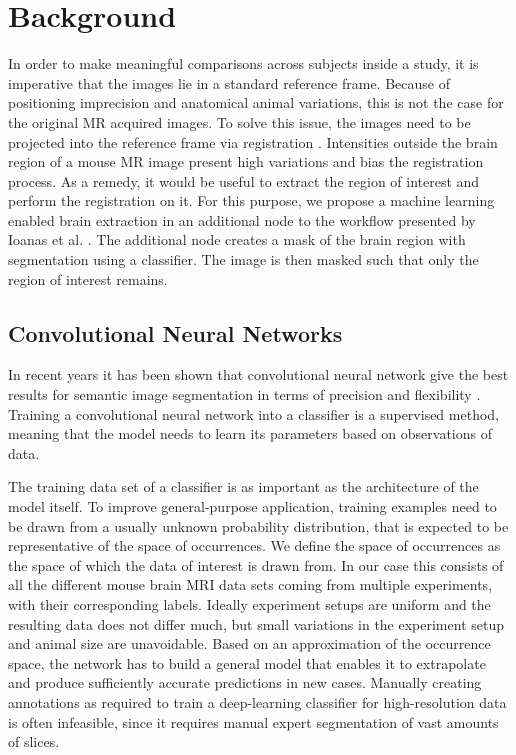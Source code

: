\section{Background}
In order to make meaningful comparisons across subjects inside a study, it is imperative that the images lie in a standard reference frame.
Because of positioning imprecision and anatomical animal variations, this is not the case for the original MR acquired images.
To solve this issue, the images need to be projected into the reference frame via registration \cite{maintz_overview_nodate, sotiras_deformable_2013}. 
Intensities outside the brain region of a mouse MR image present high variations and bias the registration process.
As a remedy, it would be useful to extract the region of interest and perform the registration on it.
For this purpose, we propose a machine learning enabled brain extraction in an additional node to the workflow presented by Ioanas et al. \cite{ioanas_optimized_2019}.
The additional node creates a mask of the brain region with segmentation using a classifier.
The image is then masked such that only the region of interest remains.


\subsection{Convolutional Neural Networks} \label{sec:Convolutional Neural Networks}
In recent years it has been shown that convolutional neural network give the best results for semantic image segmentation in terms of precision and flexibility \cite{geng_survey_2018} \cite{ronneberger_u-net:_2015}.
Training a convolutional neural network into a classifier is a supervised method, meaning that the model needs to learn its parameters based on observations of data.

The training data set of a classifier is as important as the architecture of the model itself.
To improve general-purpose application, training examples need to be drawn from a usually unknown probability distribution, that is expected to be representative of the space of occurrences.
We define the space of occurrences as the space of which the data of interest is drawn from.
In our case this consists of all the different mouse brain MRI data sets coming from multiple experiments, with their corresponding labels. 
Ideally experiment setups are uniform and the resulting data does not differ much, but small variations in the experiment setup and animal size are unavoidable.
Based on an approximation of the occurrence space, the network has to build a general model that enables it to extrapolate and produce sufficiently accurate predictions in new cases.
Manually creating annotations as required to train a deep-learning classifier for high-resolution data is often infeasible, since it requires manual expert segmentation of vast amounts of slices.


